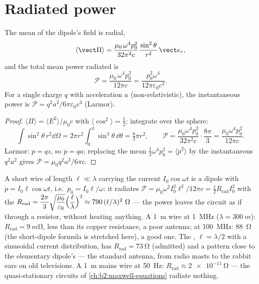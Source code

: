 \section{Radiated power}

\begin{proposition}\label{prop:b2:dipole-radiation:power}
The mean  of the dipole's field is radial,
\[
\langle\vect\Pi\rangle = \frac{\mu_0\,\omega^4p_0^2}{32\pi^2c}\,\frac{\sin^2\theta}{r^2}\,\vect e_r ,
\]
and the total mean power radiated is
\[
\mathcal P = \frac{\mu_0\,\omega^4p_0^2}{12\pi c} = \frac{p_0^2\omega^4}{12\pi\varepsilon_0c^3} .
\]
For a single charge $q$ with acceleration $a$ (non-relativistic), the
instantaneous power is $\mathcal P = q^2a^2/6\pi\varepsilon_0c^3$ (Larmor).
\end{proposition}

\begin{proof}
$\langle\Pi\rangle = \langle E^2\rangle/\mu_0c$ with $\langle\cos^2\rangle = \tfrac12$;
integrate over the sphere:
\[
\int\sin^2\theta\,r^2\dd\Omega = 2\pi r^2\int_0^\pi\sin^3\theta\,\dd\theta = \tfrac83\pi r^2 ,
\qquad
\mathcal P = \frac{\mu_0\omega^4p_0^2}{32\pi^2c}\cdot\frac{8\pi}3 = \frac{\mu_0\omega^4p_0^2}{12\pi c} .
\]
Larmor: $p = qz$, so $\ddot p = qa$;
replacing the mean $\tfrac12\omega^4p_0^2 = \langle\ddot p^2\rangle$ by the
instantaneous $q^2a^2$ gives $\mathcal P = \mu_0q^2a^2/6\pi c$.
\end{proof}

\begin{example}\label{ex:b2:dipole-radiation:antenna}
A short wire of length $\ell \ll \lambda$ carrying the current $I_0\cos\omega t$ is a
dipole with $\dot p = I_0\ell\cos\omega t$, i.e.\ $p_0 = I_0\ell/\omega$: it radiates
$\mathcal P = \mu_0\omega^2I_0^2\ell^2/12\pi c = \tfrac12R_{\text{rad}}I_0^2$ with the
\emph{} $R_{\text{rad}} = \dfrac{2\pi}3\sqrt{\dfrac{\mu_0}{\varepsilon_0}}
\Bigl(\dfrac\ell\lambda\Bigr)^2 \approx 790\,(\ell/\lambda)^2\ \Omega$ --- the power leaves the
circuit as if through a resistor, without heating anything. A \qty{1}{m}
wire at \qty{1}{MHz} ($\lambda = \qty{300}{m}$): $R_{\text{rad}} = \qty{9}{m\ohm}$, less than
its copper resistance, a poor antenna; at \qty{100}{MHz}: \qty{88}{\ohm} (the
short-dipole formula is stretched here), a good one. The \emph{}, $\ell = \lambda/2$ with a sinusoidal current distribution, has
$R_{\text{rad}} = \qty{73}{\ohm}$ (admitted) and a pattern close to the
elementary dipole's --- the standard antenna, from radio masts to the
rabbit ears on old televisions. A \qty{1}{m} mains wire at \qty{50}{Hz}:
$R_{\text{rad}} \approx \qty{2e-11}{\ohm}$ --- the quasi-stationary circuits of
\cref{ch:b2:maxwell-equations} radiate nothing.
\end{example}

